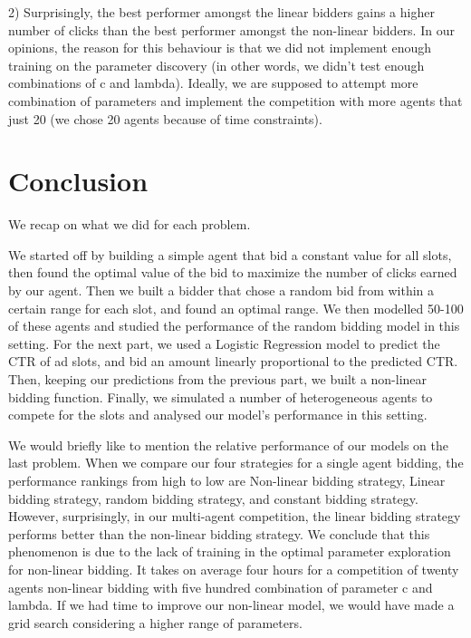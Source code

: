 \documentclass{sig-alternate-05-2015}
\begin{document}
2) Surprisingly, the best performer amongst the linear bidders gains a higher number of clicks than the best performer amongst the non-linear bidders. 
In our opinions, the reason for this behaviour is that we did not implement enough training on the parameter discovery (in other words, we didn't test enough combinations of c and lambda). 
Ideally, we are supposed to attempt more combination of parameters and implement the competition with more agents that just 20 (we chose 20 agents because of time constraints).

\section{Conclusion}

We recap on what we did for each problem.

We started off by building a simple agent that bid a constant value for all slots, then found the optimal value of the bid to maximize the number of clicks earned by our agent.
Then we built a bidder that chose a random bid from within a certain range for each slot, and found an optimal range.
We then modelled 50-100 of these agents and studied the performance of the random bidding model in this setting.
For the next part, we used a Logistic Regression model to predict the CTR of ad slots, and bid an amount linearly proportional to the predicted CTR.
Then, keeping our predictions from the previous part, we built a non-linear bidding function.
Finally, we simulated a number of heterogeneous agents to compete for the slots and analysed our model's performance in this setting.

%
We would briefly like to mention the relative performance of our models on the last problem.
When we compare our four strategies for a single agent bidding, the performance rankings from high to low are Non-linear bidding strategy, Linear bidding strategy, random bidding strategy, and constant bidding strategy. 
However, surprisingly, in our multi-agent competition, the linear bidding strategy performs better than the non-linear bidding strategy. 
We conclude that this phenomenon is due to the lack of training in the optimal parameter exploration for non-linear bidding. It takes on average four hours for a competition of twenty agents non-linear bidding with five hundred combination of parameter c and lambda. If we had time to improve our non-linear model, we would have made a grid search considering a higher range of parameters.
\end{document}
